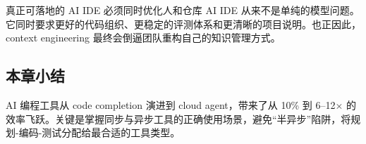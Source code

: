 \begin{knowledgebox}{真正可落地的 AI IDE 必须同时优化人和仓库}
AI IDE 从来不是单纯的模型问题。它同时要求更好的代码组织、更稳定的评测体系和更清晰的项目说明。也正因此，context engineering 最终会倒逼团队重构自己的知识管理方式。
\end{knowledgebox}

\subsection{本章小结}

AI 编程工具从 code completion 演进到 cloud agent，带来了从 10\% 到 6--12$\times$ 的效率飞跃。关键是掌握同步与异步工具的正确使用场景，避免``半异步''陷阱，将规划-编码-测试分配给最合适的工具类型。

